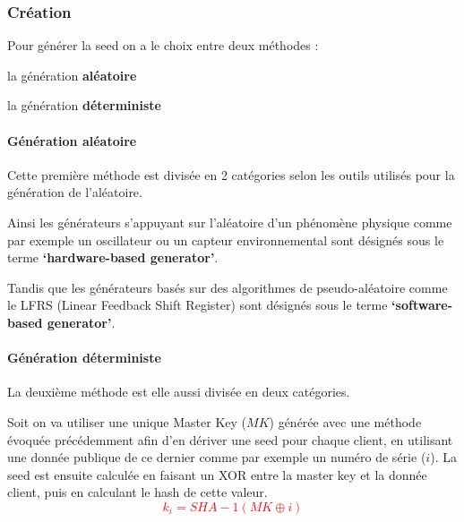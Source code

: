 \documentclass[a4paper, 10pt]{article}
\begin{document}
            \subsubsection{Création}

\noindent
Pour générer la seed on a le choix entre deux méthodes :
\begin{gitemize}
    

    \item la génération \textcolor{myblue}{\textbf{aléatoire}}
    \item la génération \textcolor{myblue}{\textbf{déterministe}}
\end{gitemize}


\paragraph*{Génération aléatoire\\}

Cette première méthode est divisée en 2 catégories selon les outils utilisés pour la génération de l’aléatoire.

Ainsi les générateurs s’appuyant sur l’aléatoire d’un \textcolor{mygreen}{phénomène physique} comme par exemple un oscillateur ou un capteur environnemental sont désignés sous le terme \textbf{\textcolor{myblue}{‘hardware-based generator’}}.

Tandis que les générateurs basés sur des \textcolor{mygreen}{algorithmes de pseudo-aléatoire} comme le LFRS (Linear Feedback Shift Register) sont désignés sous le terme \textbf{\textcolor{myblue}{‘software-based generator’}}.


\paragraph*{Génération déterministe\\}

La deuxième méthode est elle aussi divisée en deux catégories.

Soit on va utiliser une \textcolor{myblue}{unique Master Key} \textcolor{mygreen}{($MK$)} générée avec une méthode évoquée précédemment afin d’en \textcolor{myblue}{dériver une seed} pour chaque client,
en utilisant une \textcolor{mygreen}{donnée publique} de ce dernier comme par exemple un numéro de série \textcolor{mygreen}{($i$)}.
La seed est ensuite calculée en faisant un XOR entre la master key et la donnée client, puis en calculant le hash de cette valeur.
\textcolor{red}{$$
    k_i = SHA-1(MK \oplus i)
$$}
\end{document}
